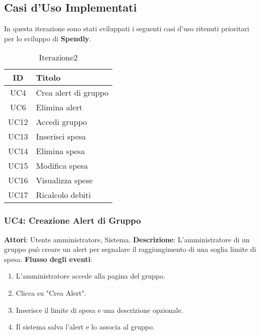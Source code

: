 \subsection{Casi d'Uso Implementati }

In questa iterazione sono stati sviluppati i seguenti casi d’uso ritenuti prioritari per lo sviluppo di \textbf{Spendly}.

\begin{table}[h]
    \centering
    \begin{tabular}{|c|l|}
    \hline
    \textbf{ID} & \textbf{Titolo} \\ \hline
    UC4 & Crea alert di gruppo\\ \hline
    UC6 & Elimina alert \\ \hline
    UC12 & Accedi gruppo \\ \hline
    UC13 & Inserisci spesa \\ \hline
    UC14 & Elimina spesa \\ \hline
    UC15 & Modifica spesa \\ \hline
    UC16 & Visualizza spese \\ \hline
    UC17 & Ricalcolo debiti \\ \hline
    \end{tabular}
    \caption{Iterazione2}
\end{table}

\subsubsection{UC4: Creazione Alert di Gruppo}
\textbf{Attori}: Utente amministratore, Sistema.
\newline
\newline
\textbf{Descrizione}: L’amministratore di un gruppo può creare un alert per segnalare il raggiungimento di una soglia limite di spesa.
\newline
\newline
\textbf{Flusso degli eventi}:
\begin{enumerate}
    \item L’amministratore accede alla pagina del gruppo.
    \item Clicca su "Crea Alert".
    \item Inserisce il limite di spesa e una descrizione opzionale.
    \item Il sistema salva l’alert e lo associa al gruppo.
\end{enumerate}

